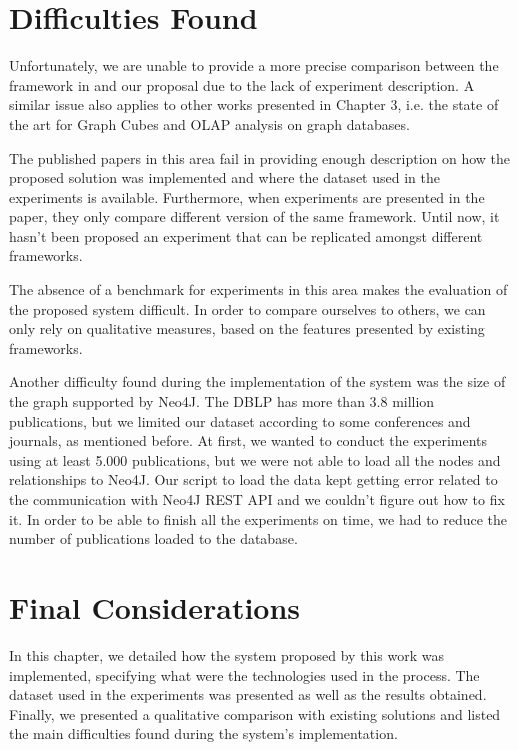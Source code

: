 \section{Difficulties Found}

Unfortunately, we are unable to provide a more precise comparison between the framework in \cite{Ghrab2013} and our proposal due to the lack of experiment description. A similar issue also applies to other works presented in Chapter 3, i.e. the state of the art for Graph Cubes and OLAP analysis on graph databases.

The published papers in this area fail in providing enough description on how the proposed solution was implemented and where the dataset used in the experiments is available. Furthermore, when experiments are presented in the paper, they only compare different version of the same framework. Until now, it hasn't been proposed an experiment that can be replicated amongst different frameworks.

The absence of a benchmark for experiments in this area makes the evaluation of the proposed system difficult. In order to compare ourselves to others, we can only rely on qualitative measures, based on the features presented by existing frameworks.

Another difficulty found during the implementation of the system was the size of the graph supported by Neo4J. The DBLP has more than 3.8 million publications, but we limited our dataset according to some conferences and journals, as mentioned before. At first, we wanted to conduct the experiments using at least 5.000 publications, but we were not able to load all the nodes and relationships to Neo4J. Our script to load the data kept getting error related to the communication with Neo4J REST API and we couldn't figure out how to fix it. In order to be able to finish all the experiments on time, we had to reduce the number of publications loaded to the database.

\section{Final Considerations}
In this chapter, we detailed how the system proposed by this work was implemented, specifying what were the technologies used in the process. The dataset used in the experiments was presented as well as the results obtained. Finally, we presented a qualitative comparison with existing solutions and listed the main difficulties found during the system's implementation.